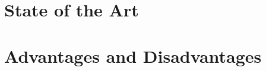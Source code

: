 \documentclass{beamer}
\begin{document}
\section{State of the Art}
\label{sec:state-of-the-art}







\section{Advantages and Disadvantages}
\label{sec:advantages-and-disadvantages}
\end{document}
